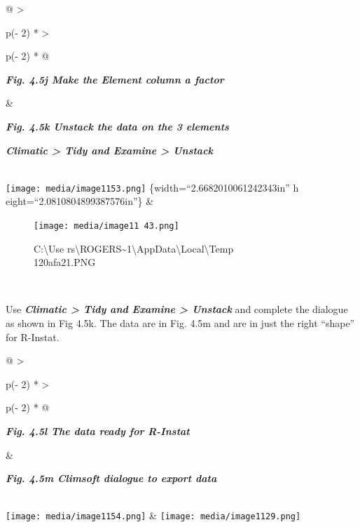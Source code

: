 \documentclass[
  letterpaper,
  DIV=11,
  numbers=noendperiod]{scrreprt}
\begin{document}
\begin{longtable}[]{@{}
  >{\raggedright\arraybackslash}p{(\columnwidth - 2\tabcolsep) * }
  >{\raggedright\arraybackslash}p{(\columnwidth - 2\tabcolsep) * }@{}}
\toprule\noalign{}
\begin{minipage}[b]{\linewidth}\raggedright
\textbf{\emph{Fig. 4.5j Make the Element column a factor}}
\end{minipage} & \begin{minipage}[b]{\linewidth}\raggedright
\textbf{\emph{Fig. 4.5k Unstack the data on the 3 elements}}

\textbf{\emph{Climatic \textgreater{} Tidy and Examine \textgreater{}
Unstack}}
\end{minipage} \\
\midrule\noalign{}
\endhead
\bottomrule\noalign{}
\endlastfoot
\texttt{[image: media/image1153.png]} \{width=``2.6682010061242343in'' h
eight=``2.0810804899387576in''\} &
\begin{minipage}[t]{\linewidth}\raggedright
\begin{figure}[H]

{\centering \texttt{[image: media/image11 43.png]}

}

\caption{C:\textbackslash Use
rs\textbackslash ROGERS\textasciitilde1\textbackslash AppData\textbackslash Local\textbackslash Temp\\
\SNAGHTML120afa21.PNG}

\end{figure}%
\end{minipage} \\
\end{longtable}

Use \textbf{\emph{Climatic \textgreater{} Tidy and Examine
\textgreater{} Unstack}} and complete the dialogue as shown in Fig 4.5k.
The data are in Fig. 4.5m and are in just the right ``shape'' for
R-Instat.

\begin{longtable}[]{@{}
  >{\raggedright\arraybackslash}p{(\columnwidth - 2\tabcolsep) * }
  >{\raggedright\arraybackslash}p{(\columnwidth - 2\tabcolsep) * }@{}}
\toprule\noalign{}
\begin{minipage}[b]{\linewidth}\raggedright
\textbf{\emph{Fig. 4.5l The data ready for R-Instat}}
\end{minipage} & \begin{minipage}[b]{\linewidth}\raggedright
\textbf{\emph{Fig. 4.5m Climsoft dialogue to export data}}
\end{minipage} \\
\midrule\noalign{}
\endhead
\bottomrule\noalign{}
\endlastfoot
\texttt{[image: media/image1154.png]} &
\texttt{[image: media/image1129.png]} \\
\end{longtable}
\end{document}
